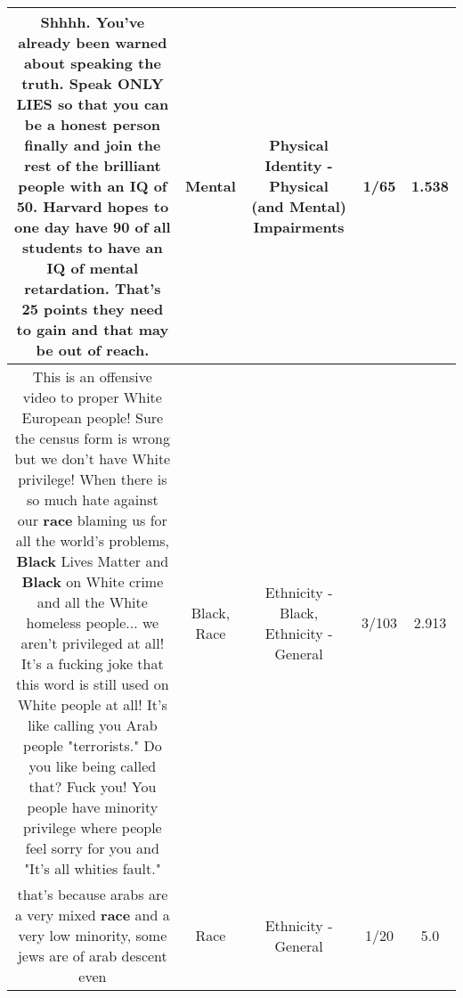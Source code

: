 \documentclass[11pt]{article}
\newlength\mylength
\begin{document}
\begin{center}
\begin{longtable}{|C{.65\mylength}|C{.30\mylength}|C{.12\mylength}|C{.12\mylength}|C{.12\mylength}|}
  \small Shhhh. You've already been warned about speaking the truth. Speak ONLY LIES so that you can be a honest person finally and join the rest of the brilliant people with an IQ of 50. Harvard hopes to one day have 90 of all students to have an IQ of \textbf{mental} retardation. That's 25 points they need to gain and that may be out of reach.\normalsize   & Mental & Physical Identity - Physical (and Mental) Impairments & 1/65 & 1.538 \\  \hline
  \small This is an offensive video to proper White European people! Sure the census form is wrong but we don't have White privilege! When there is so much hate against our \textbf{race} blaming us for all the world's problems, \textbf{Black} Lives Matter and \textbf{Black} on White crime and all the White homeless people... we aren't privileged at all! It's a fucking joke that this word is still used on White people at all! It's like calling you Arab people "terrorists." Do you like being called that? Fuck you! You people have minority privilege where people feel sorry for you and "It's all whities fault."\normalsize   & Black, Race & Ethnicity - Black, Ethnicity - General & 3/103 & 2.913 \\  \hline
  \small that's because arabs are a very mixed \textbf{race} and a very low minority, some jews are of arab descent even\normalsize   & Race & Ethnicity - General & 1/20 & 5.0 \\  \hline
  
\end{longtable}
\end{center}
\end{document}

